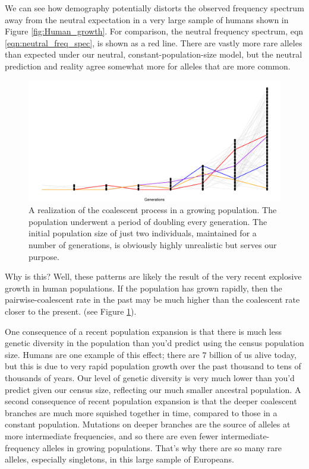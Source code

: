 We can see how demography potentially distorts the observed frequency spectrum away from the neutral expectation in a very large sample of humans shown in Figure \ref{fig:Human_growth}. For
comparison, the neutral frequency spectrum, eqn
\eqref{eqn:neutral_freq_spec}, is shown as a red line. There are
  vastly more rare alleles than expected under our neutral, constant-population-size model, but the neutral prediction and reality agree somewhat more for alleles that are more common.  

\begin{figure}
\begin{center}
  \includegraphics[width = \textwidth]{figures/Genetic_drift/Demography/Growth_genealogy.pdf}
\end{center}
\caption{A realization of the coalescent process in a growing population. The population underwent a period of doubling every generation. The initial population size of just two individuals, maintained for a number of generations, is obviously highly unrealistic but serves our purpose.   } \label{fig:Genealogy_growth}
\end{figure}

Why is this? Well, these patterns are likely the result of the very recent
explosive growth in human populations. If the population has grown rapidly, then the pairwise-coalescent rate in the past may be much higher than the coalescent rate closer to the present. (see Figure \ref{fig:Genealogy_growth}). 

One consequence of a recent population expansion is that there is much less genetic diversity in the population than you'd predict using the census
population size. Humans are one example of this effect; there are $7$ billion
of us alive today, but this is due to very rapid population growth
over the past thousand to tens of thousands of years. Our level of
genetic diversity is very much lower than you'd predict given our
census size, reflecting our much smaller ancestral population. A second consequence of recent population expansion is that the deeper coalescent branches are much more squished together in time, compared to those in a constant population.  Mutations on deeper branches are the source of alleles at more intermediate frequencies, and so there are even fewer intermediate-frequency alleles
in growing populations. That's why there are so many rare alleles,
especially singletons, in this large sample of Europeans. 


